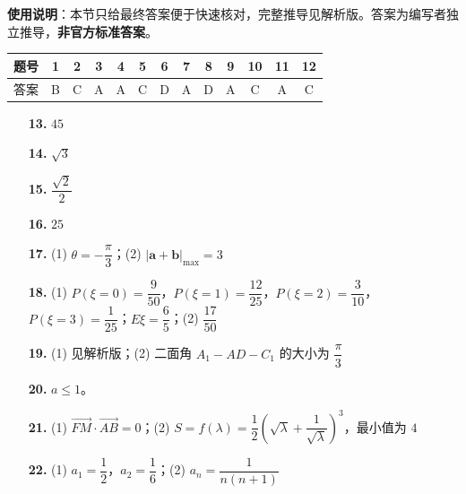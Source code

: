 
\begin{gknotice}
\textbf{使用说明}：本节只给最终答案便于快速核对，完整推导见解析版。答案为编写者独立推导，\textbf{非官方标准答案}。
\end{gknotice}

\begin{center}\begin{tabular}{ccccccccccccc}
\toprule
题号 & 1 & 2 & 3 & 4 & 5 & 6 & 7 & 8 & 9 & 10 & 11 & 12 \\
\midrule
答案 & B & C & A & A & C & D & A & D & A & C & A & C \\
\bottomrule
\end{tabular}\end{center}

\begin{itemize}[leftmargin=2.6em]
  \item[\textbf{13.}] $45$
  \item[\textbf{14.}] $\sqrt3$
  \item[\textbf{15.}] $\dfrac{\sqrt2}{2}$
  \item[\textbf{16.}] $25$
\end{itemize}

\begin{itemize}[leftmargin=2.6em]
  \item[\textbf{17.}] (1) $\theta=-\dfrac\pi3$；(2) $|\boldsymbol a+\boldsymbol b|_{\max}=3$
  \item[\textbf{18.}] (1) $P(\xi=0)=\dfrac9{50}$，$P(\xi=1)=\dfrac{12}{25}$，$P(\xi=2)=\dfrac3{10}$，$P(\xi=3)=\dfrac1{25}$；$E\xi=\dfrac65$；(2) $\dfrac{17}{50}$
  \item[\textbf{19.}] (1) 见解析版；(2) 二面角 $A_1-AD-C_1$ 的大小为 $\dfrac\pi3$
  \item[\textbf{20.}] $a\leqslant1$。
  \item[\textbf{21.}] (1) $\overrightarrow{FM}\cdot\overrightarrow{AB}=0$；(2) $S=f(\lambda)=\dfrac12\left(\sqrt\lambda+\dfrac1{\sqrt\lambda}\right)^3$，最小值为 $4$
  \item[\textbf{22.}] (1) $a_1=\dfrac12$，$a_2=\dfrac16$；(2) $a_n=\dfrac1{n(n+1)}$
\end{itemize}
